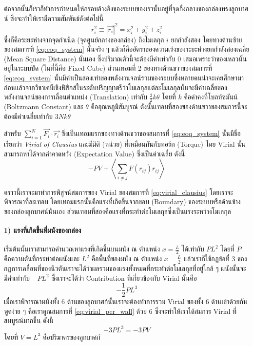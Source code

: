 ต่อจากนั้นก็เราก็ทำการกำหนดให้กรอบอ้างอิงของระบบของเรานั้นอยู่ที่จุดกึ่งกลางของกล่องทรงลูกบาศน์ ซึ่งจะทำให้เรามีความสัมพันธ์ดังต่อไปนี้
%
\begin{equation}
    r_i^2\equiv \left| \vec{r_i}\right|^2
    =
    x_i^2+y_i^2+z_i^2
\end{equation}
%
ซึ่งก็คือระยะห่างจากจุดกำเนิด (จุดศูนย์กลางของกล่อง) ถึงโมเลกุล $i$ ยกกำลังสอง โดยทางด้านซ้ายของสมการที่ \eqref{eq:eoq_system} นั้นจริง ๆ แล้วก็คืออัตราของความเร่งของระยะห่างยกกำลังสองเฉลี่ย (Mean Square Distance) นั่นเอง ซึ่งปริมาณตัวนี้จะต้องมีค่าเท่ากับ 0 เสมอเพราะว่าของเหลวนั้นอยู่ในระบบปิด (ในที่นี้คือ Fixed Cube) ส่วนเทอมที่ 2 ของทางด้านขวาของสมการที่ \eqref{eq:eoq_system} นั้นมีค่าเป็นสองเท่าของพลังงานจลน์รวมของระบบซึ่งหลายคนน่าจะเคยศึกษามาก่อนแล้วจากวิชาเคมีเชิงฟิสิกส์ในระดับปริญญาตรีว่าโมเลกุลแต่ละโมเลกุลนั้นจะมีค่าเฉลี่ยของพลังงานจลน์ของการเลื่อนตำแหน่ง (Translation) เท่ากับ $\frac 32k\theta$ โดยที่ $k$ คือค่าคงที่โบลท์ซมันน์ (Boltzmann Constant) และ $\theta$ คืออุณหภูมิสัมบูรณ์ ดังนั้นเทอมที่สองของด้านขวาของสมการนี้จะต้องมีค่าเฉลี่ยเท่ากับ $3Nk\theta$

สำหรับ $\sum_{i=1}^{N} \vec{F_i}\cdot \vec{r_i}$ ซึ่งเป็นเทอมแรกของทางด้านขวาของสมการที่ \eqref{eq:eoq_system} นั้นมีชื่อเรียกว่า \emph{Virial of Clausius} และมีมิติ (หน่วย) ที่เหมือนกันกับทอร์ก (Torque) โดย Virial นั้นสามารถหาได้จากค่าคาดหวัง (Expectation Value) ซึ่งเป็นค่าเฉลี่ย ดังนี้
%
\begin{equation}
    \label{eq:virial_clausius}
    -PV + \left\langle \sum_{i\neq j}F(r_{ij})r_{ij}\right\rangle
\end{equation}

คราวนี้เราจะมาทำการพิสูจน์สมการของ Virial ของสมการที่ \eqref{eq:virial_clausius} โดยเราจะพิจารณาที่ละเทอม โดยเทอมแรกนั้นคือแรงที่เกิดขึ้นจากขอบ (Boundary) ของระบบหรือด้านข้างของกล่องลูกบาศน์นั่นเอง ส่วนเทอมที่สองคือแรงที่กระทำต่อโมเลกุลซึ่งเป็นแรงระหว่างโมเลกุล

\paragraph{1) แรงที่เกิดขึ้นที่ผนังของกล่อง} เริ่มต้นนั้นเราสามารถคำนวณหาแรงที่เกิดขึ้นบนผนัง ณ ตำแหน่ง $x=\frac L2$ ได้เท่ากับ $PL^2$ โดยที่ $P$ คือความดันที่กระทำต่อผนังและ $L^2$ คือพื้นที่ของผนัง ณ ตำแหน่ง $x=\frac L2$ แล้วเราก็ใช้กฎข้อที่ 3 ของกฎการเคลื่อนที่ของนิวตันเราจะได้ว่าผลรวมของแรงทั้งหมดที่กระทำต่อโมเลกุลที่อยู่ใกล้ ๆ ผนังนั้นจะมีค่าเท่ากับ  $-PL^2$ ซึ่งเราจะได้ว่า Contribution ที่เกี่ยวข้องกับ Virial นั้นคือ
%
\begin{equation}
    \label{eq:virial_per_wall}
    -\frac 12PL^3
\end{equation}
%
เมื่อเราพิจารณาผนังทั้ง 6 ด้านของลูกบาศก์นั้นเราจะต้องทำการรวม Virial ของทั้ง 6 ด้านเข้าด้วยกัน พูดง่าย ๆ คือเราคูณสมการที่ \eqref{eq:virial_per_wall} ด้วย 6 ซึ่งจะทำให้เราได้สมการ Virial ที่สมบูรณ์มากขึ้น ดังนี้
%
\begin{equation}
    -3PL^3 
    = 
    -3PV
\end{equation}
%
โดยที่ $V=L^3$ คือปริมาตรของลูกบาศก์

